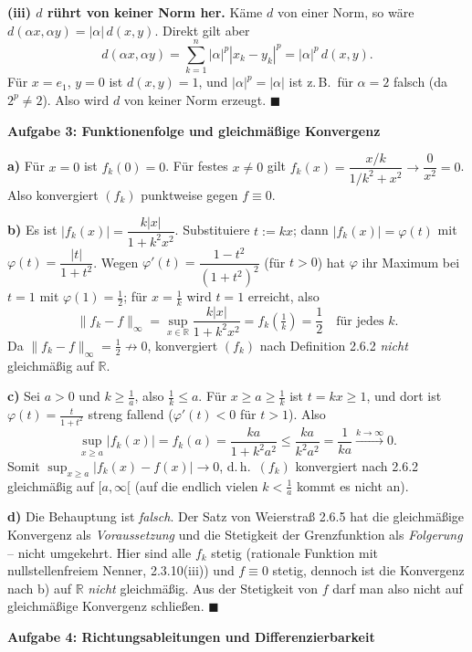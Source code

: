 \documentclass[a4paper,12pt]{article}
\providecommand{\qed}{\hfill\ensuremath{\blacksquare}}
\newcommand{\aufgabe}[2]{%
  \bigskip\par\noindent\textbf{Aufgabe #1: #2}\par\nobreak\medskip}
\begin{document}
\textbf{(iii) $d$ rührt von keiner Norm her.} Käme $d$ von einer Norm, so wäre $d(\alpha x,\alpha y)=|\alpha|\,d(x,y)$. Direkt gilt aber
\[
d(\alpha x,\alpha y)=\sum_{k=1}^n|\alpha|^p|x_k-y_k|^p=|\alpha|^p\,d(x,y).
\]
Für $x=e_1$, $y=0$ ist $d(x,y)=1$, und $|\alpha|^p=|\alpha|$ ist z.\,B.\ für $\alpha=2$ falsch (da $2^p\neq 2$). Also wird $d$ von keiner Norm erzeugt. \qed

\aufgabe{3}{Funktionenfolge und gleichmäßige Konvergenz}

\textbf{a)} Für $x=0$ ist $f_k(0)=0$. Für festes $x\neq0$ gilt $f_k(x)=\dfrac{x/k}{1/k^2+x^2}\to\dfrac{0}{x^2}=0$. Also konvergiert $(f_k)$ punktweise gegen $f\equiv 0$.

\textbf{b)} Es ist $|f_k(x)|=\dfrac{k|x|}{1+k^2x^2}$. Substituiere $t:=kx$; dann $|f_k(x)|=\varphi(t)$ mit $\varphi(t)=\dfrac{|t|}{1+t^2}$. Wegen $\varphi'(t)=\dfrac{1-t^2}{(1+t^2)^2}$ (für $t>0$) hat $\varphi$ ihr Maximum bei $t=1$ mit $\varphi(1)=\tfrac12$; für $x=\tfrac1k$ wird $t=1$ erreicht, also
\[
\|f_k-f\|_\infty=\sup_{x\in\mathbb{R}}\frac{k|x|}{1+k^2x^2}=f_k\!\left(\tfrac1k\right)=\frac{1}{2}\quad\text{für jedes }k.
\]
Da $\|f_k-f\|_\infty=\tfrac12\not\to0$, konvergiert $(f_k)$ nach Definition 2.6.2 \emph{nicht} gleichmäßig auf $\mathbb{R}$.

\textbf{c)} Sei $a>0$ und $k\ge\tfrac1a$, also $\tfrac1k\le a$. Für $x\ge a\ge\tfrac1k$ ist $t=kx\ge1$, und dort ist $\varphi(t)=\tfrac{t}{1+t^2}$ streng fallend ($\varphi'(t)<0$ für $t>1$). Also
\[
\sup_{x\ge a}|f_k(x)|=f_k(a)=\frac{ka}{1+k^2a^2}\le\frac{ka}{k^2a^2}=\frac{1}{ka}\xrightarrow{k\to\infty}0.
\]
Somit $\sup_{x\ge a}|f_k(x)-f(x)|\to0$, d.\,h.\ $(f_k)$ konvergiert nach 2.6.2 gleichmäßig auf $[a,\infty[$ (auf die endlich vielen $k<\tfrac1a$ kommt es nicht an).

\textbf{d)} Die Behauptung ist \emph{falsch}. Der Satz von Weierstraß 2.6.5 hat die gleichmäßige Konvergenz als \emph{Voraussetzung} und die Stetigkeit der Grenzfunktion als \emph{Folgerung} -- nicht umgekehrt. Hier sind alle $f_k$ stetig (rationale Funktion mit nullstellenfreiem Nenner, 2.3.10(iii)) und $f\equiv0$ stetig, dennoch ist die Konvergenz nach b) auf $\mathbb{R}$ \emph{nicht} gleichmäßig. Aus der Stetigkeit von $f$ darf man also nicht auf gleichmäßige Konvergenz schließen. \qed

\aufgabe{4}{Richtungsableitungen und Differenzierbarkeit}
\end{document}
